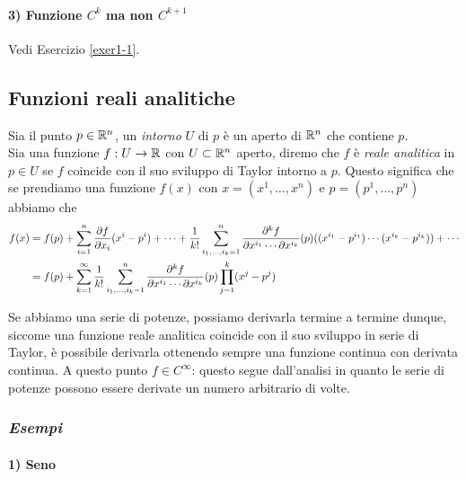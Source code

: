 \paragraph{3) Funzione $ C^{k} $ ma non $ C^{k+1} $}

Vedi Esercizio \ref{exer1-1}.

\subsection{Funzioni reali analitiche}

Sia il punto $ p \in \mathbb{R}^{n} $, un \textit{intorno} $ U $ di $ p $ è un aperto di $ \mathbb{R}^{n} $ che contiene $ p $. \\
Sia una funzione $ f : U \to \mathbb{R} $ con $ U \subset \mathbb{R}^{n} $ aperto, diremo che $ f $ è \textit{reale analitica} in $ p \in U $ se $ f $ coincide con il suo sviluppo di Taylor intorno a $ p $. Questo significa che se prendiamo una funzione $ f (x) $ con $ x = (x^{1}, \dots, x^{n}) $ e $ p = (p^{1}, \dots, p^{n}) $ abbiamo che
\begin{align}
	\begin{split}
		f (x) &= f (p) + \sum_{i=1}^{n} \pdv{f}{x_{i}} (p) (x^{i} - p^{i}) + \cdots + \dfrac{1}{k!} \sum_{i_{1},\dots,i_{k}=1}^{n} \dfrac{\partial^{k} f}{\partial x^{i_{1}} \cdots \partial x^{i_{k}}} (p) ( (x^{i_{1}} - p^{i_{1}}) \cdots (x^{i_{k}} - p^{i_{k}}) ) + \cdots \\
		&= f (p) + \sum_{k=1}^{\infty} \dfrac{1}{k!} \sum_{i_{1},\dots,i_{k}=1}^{n} \dfrac{\partial^{k} f}{\partial x^{i_{1}} \cdots \partial x^{i_{k}}} (p) \prod_{j=1}^{k} (x^{j} - p^{j})
	\end{split}
\end{align}

Se abbiamo una serie di potenze, possiamo derivarla termine a termine dunque, siccome una funzione reale analitica coincide con il suo sviluppo in serie di Taylor, è possibile derivarla ottenendo sempre una funzione continua con derivata continua. A questo punto $ f \in C^{\infty} $: questo segue dall'analisi in quanto le serie di potenze possono essere derivate un numero arbitrario di volte.

\subsubsection{\textit{Esempi}}

\paragraph{1) Seno}

